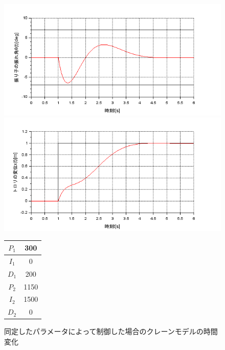 \documentclass[dvipdfmx,titlepage,a4j]{jsarticle}  %
\begin{document}
\begin{figure}[H]
  \begin{minipage}{4.5cm}
    \centering
    \includegraphics[keepaspectratio, scale=0.35]{../graph/crane/ang-fin-up.png}
  \end{minipage}
  \hfill
  \begin{minipage}{4.5cm}
    \centering
    \includegraphics[keepaspectratio, scale=0.35]{../graph/crane/po-fin-up.png}
  \end{minipage}
  \hfill
  \begin{minipage}{3cm}
    \begin{center}
      \begin{tabular}{c|c}
        \hline
        $P_1$ & 300  \\ \hline
        $I_1$ & 0    \\ \hline
        $D_1$ & 200  \\ \hline
        $P_2$ & 1150 \\ \hline
        $I_2$ & 1500 \\ \hline
        $D_2$ & 0    \\
        \hline
      \end{tabular}
    \end{center}
  \end{minipage}
  \hfill
  \caption{同定したパラメータによって制御した場合のクレーンモデルの時間変化}
  \label{fig:crane:fin-up}
\end{figure}
\end{document}
